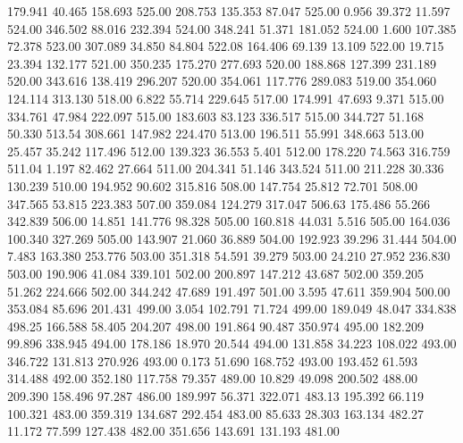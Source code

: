  179.941   40.465  158.693       525.00
 208.753  135.353   87.047       525.00
   0.956   39.372   11.597       524.00
 346.502   88.016  232.394       524.00
 348.241   51.371  181.052       524.00
   1.600  107.385   72.378       523.00
 307.089   34.850   84.804       522.08
 164.406   69.139   13.109       522.00
  19.715   23.394  132.177       521.00
 350.235  175.270  277.693       520.00
 188.868  127.399  231.189       520.00
 343.616  138.419  296.207       520.00
 354.061  117.776  289.083       519.00
 354.060  124.114  313.130       518.00
   6.822   55.714  229.645       517.00
 174.991   47.693    9.371       515.00
 334.761   47.984  222.097       515.00
 183.603   83.123  336.517       515.00
 344.727   51.168   50.330       513.54
 308.661  147.982  224.470       513.00
 196.511   55.991  348.663       513.00
  25.457   35.242  117.496       512.00
 139.323   36.553    5.401       512.00
 178.220   74.563  316.759       511.04
   1.197   82.462   27.664       511.00
 204.341   51.146  343.524       511.00
 211.228   30.336  130.239       510.00
 194.952   90.602  315.816       508.00
 147.754   25.812   72.701       508.00
 347.565   53.815  223.383       507.00
 359.084  124.279  317.047       506.63
 175.486   55.266  342.839       506.00
  14.851  141.776   98.328       505.00
 160.818   44.031    5.516       505.00
 164.036  100.340  327.269       505.00
 143.907   21.060   36.889       504.00
 192.923   39.296   31.444       504.00
   7.483  163.380  253.776       503.00
 351.318   54.591   39.279       503.00
  24.210   27.952  236.830       503.00
 190.906   41.084  339.101       502.00
 200.897  147.212   43.687       502.00
 359.205   51.262  224.666       502.00
 344.242   47.689  191.497       501.00
   3.595   47.611  359.904       500.00
 353.084   85.696  201.431       499.00
   3.054  102.791   71.724       499.00
 189.049   48.047  334.838       498.25
 166.588   58.405  204.207       498.00
 191.864   90.487  350.974       495.00
 182.209   99.896  338.945       494.00
 178.186   18.970   20.544       494.00
 131.858   34.223  108.022       493.00
 346.722  131.813  270.926       493.00
   0.173   51.690  168.752       493.00
 193.452   61.593  314.488       492.00
 352.180  117.758   79.357       489.00
  10.829   49.098  200.502       488.00
 209.390  158.496   97.287       486.00
 189.997   56.371  322.071       483.13
 195.392   66.119  100.321       483.00
 359.319  134.687  292.454       483.00
  85.633   28.303  163.134       482.27
  11.172   77.599  127.438       482.00
 351.656  143.691  131.193       481.00
